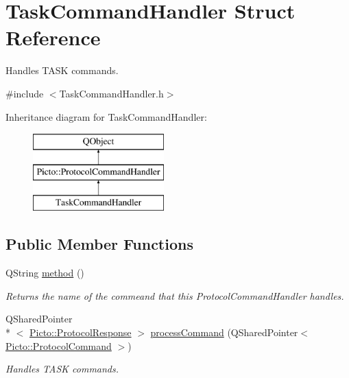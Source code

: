 \hypertarget{struct_task_command_handler}{\section{Task\-Command\-Handler Struct Reference}
\label{struct_task_command_handler}
}


Handles T\-A\-S\-K commands.  




{\ttfamily \#include $<$Task\-Command\-Handler.\-h$>$}

Inheritance diagram for Task\-Command\-Handler\-:\begin{figure}[H]
\begin{center}
\leavevmode
\includegraphics[height=3.000000cm]{struct_task_command_handler}
\end{center}
\end{figure}
\subsection*{Public Member Functions}
\begin{DoxyCompactItemize}
\item 
\hypertarget{struct_task_command_handler_a96af00fe25a467c2f1ce93f55b154855}{Q\-String \hyperlink{struct_task_command_handler_a96af00fe25a467c2f1ce93f55b154855}{method} ()}\label{struct_task_command_handler_a96af00fe25a467c2f1ce93f55b154855}

\begin{DoxyCompactList}\small\item\em Returns the name of the commeand that this Protocol\-Command\-Handler handles. \end{DoxyCompactList}\item 
Q\-Shared\-Pointer\\*
$<$ \hyperlink{struct_picto_1_1_protocol_response}{Picto\-::\-Protocol\-Response} $>$ \hyperlink{struct_task_command_handler_ae173f70c2915c168a3b0b0e8a76c1d3a}{process\-Command} (Q\-Shared\-Pointer$<$ \hyperlink{struct_picto_1_1_protocol_command}{Picto\-::\-Protocol\-Command} $>$)
\begin{DoxyCompactList}\small\item\em Handles T\-A\-S\-K commands. \end{DoxyCompactList}\end{DoxyCompactItemize}


